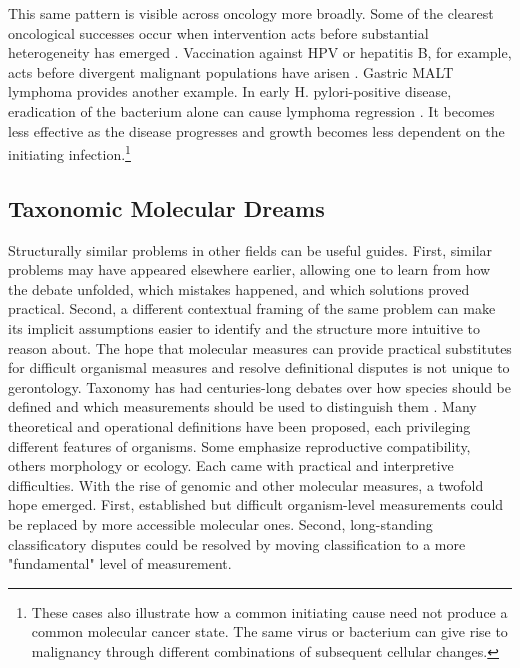 \documentclass[twocolumn]{article} %
\begin{document}
This same pattern is visible across oncology more broadly. Some of the clearest oncological successes occur when intervention acts before substantial heterogeneity has emerged \citep[b]{druker2025imatinib}. Vaccination against HPV or hepatitis B, for example, acts before divergent malignant populations have arisen \cite{kao2015hepatitis}. Gastric MALT lymphoma provides another example. In early H. pylori-positive disease, eradication of the bacterium alone can cause lymphoma regression \cite{bayerdorffer1995regression}. It becomes less effective as the disease progresses and growth becomes less dependent on the initiating infection.\footnote{These cases also illustrate how a common initiating cause need not produce a common molecular cancer state. The same virus or bacterium can give rise to malignancy through different combinations of subsequent cellular changes.}

\subsection{Taxonomic Molecular Dreams}

Structurally similar problems in other fields can be useful guides. First, similar problems may have appeared elsewhere earlier, allowing one to learn from how the debate unfolded, which mistakes happened, and which solutions proved practical. Second, a different contextual framing of the same problem can make its implicit assumptions easier to identify and the structure more intuitive to reason about. The hope that molecular measures can provide practical substitutes for difficult organismal measures and resolve definitional disputes is not unique to gerontology. Taxonomy has had centuries-long debates over how species should be defined \cite{kunz2013species, simpson1945principles} \citep[e]{claridge1997species} and which measurements should be used to distinguish them \citep[c]{kunz2013species}. Many theoretical and operational definitions have been proposed, each privileging different features of organisms. Some emphasize reproductive compatibility, others morphology or ecology. Each came with practical and interpretive difficulties. With the rise of genomic and other molecular measures, a twofold hope emerged. First, established but difficult organism-level measurements could be replaced by more accessible molecular ones. Second, long-standing classificatory disputes could be resolved by moving classification to a more "fundamental" level of measurement.
\end{document}
